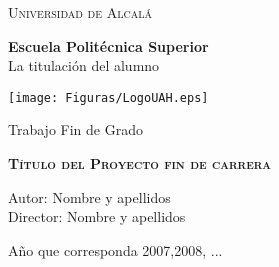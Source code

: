 \setcounter{page}{0}

\begin{center}
\LARGE \textsc{Universidad de Alcalá}\\
\vspace{0.5cm}

\textbf{Escuela Politécnica Superior}\\

La titulación del alumno\\
\end{center}

\vspace{0.5cm}


\begin{center}
\texttt{[image: Figuras/LogoUAH.eps]}
\end{center}


\begin{center}
\vspace{1cm}

\LARGE Trabajo Fin de Grado\\

\vspace{0.5cm}

\textbf{\Huge \textsc{{Título del Proyecto fin de carrera}}}\\

\vspace{1.5cm}

\large Autor: Nombre y apellidos\\
Director: Nombre y apellidos\\

\vspace{1.5cm}

\large Año que corresponda 2007,2008, ...\\
\end{center}


